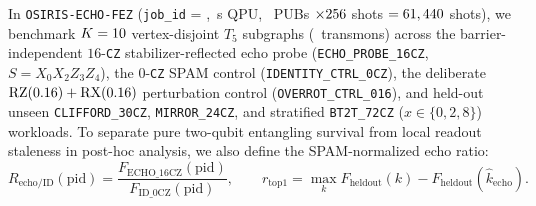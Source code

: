 \documentclass[aps,prx,twocolumn,superscriptaddress,nofootinbib]{revtex4-2}
\begin{document}
In \texttt{OSIRIS-ECHO-FEZ} (\texttt{job\_id} = \remEchoJobId, \remEchoQpuSec\,s QPU, \remEchoTotalPubs\ PUBs $\times 256$ shots $= 61,440$ shots), we benchmark $K = 10$ vertex-disjoint $T_5$ subgraphs (\remEchoTotalTransmons\ transmons) across the barrier-independent $16$-\texttt{CZ} stabilizer-reflected echo probe (\texttt{ECHO\_PROBE\_16CZ}, $S = X_0 X_2 Z_3 Z_4$), the $0$-\texttt{CZ} SPAM control (\texttt{IDENTITY\_CTRL\_0CZ}), the deliberate $\mathrm{RZ}(0.16)+\mathrm{RX}(0.16)$ perturbation control (\texttt{OVERROT\_CTRL\_016}), and held-out unseen \texttt{CLIFFORD\_30CZ}, \texttt{MIRROR\_24CZ}, and stratified \texttt{BT2T\_72CZ} ($x \in \{0, 2, 8\}$) workloads. To separate pure two-qubit entangling survival from local readout staleness in post-hoc analysis, we also define the SPAM-normalized echo ratio:
\begin{equation}
  R_{\mathrm{echo/ID}}(\mathrm{pid}) = \frac{F_{\mathrm{ECHO\_16CZ}}(\mathrm{pid})}{F_{\mathrm{ID\_0CZ}}(\mathrm{pid})}, \qquad
  r_{\mathrm{top1}} = \max_{k} F_{\mathrm{heldout}}(k) - F_{\mathrm{heldout}}(\hat{k}_{\mathrm{echo}}).
  \label{eq:echo_spam_norm}
\end{equation}
\end{document}
